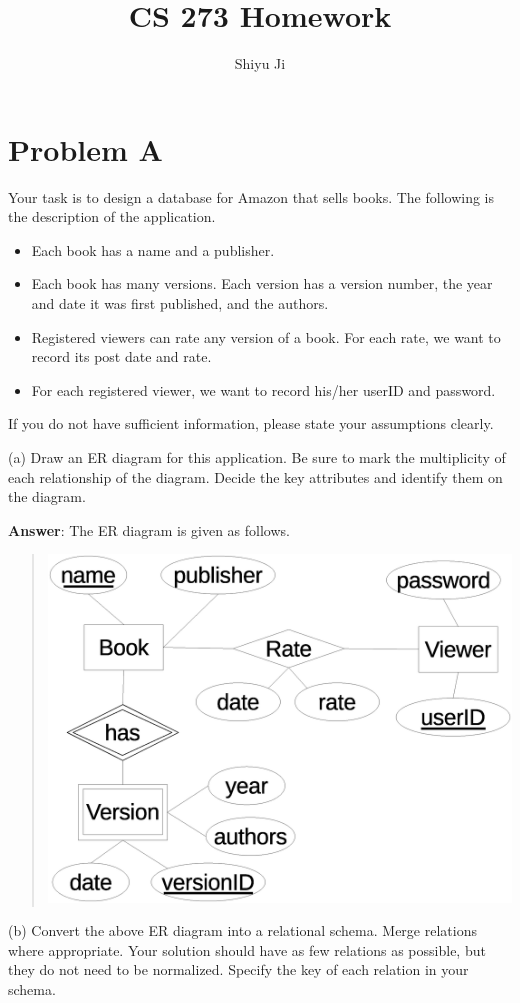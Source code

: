 \documentclass{article}
\begin{document}
\title{\bf CS 273 Homework}
\author{Shiyu Ji}
\date{}
\maketitle

\section{Problem A}
Your task is to design a database for Amazon that sells books.
The following is the description of the application.
\begin{itemize}
\item Each book has a name and a publisher.
\item Each book has many versions. Each version has a version number, the year and date it was first published, and the authors.
\item Registered viewers can rate any version of a book. For each rate, we want to record its post date and rate.
\item For each registered viewer, we want to record his/her userID and password.
\end{itemize}
If you do not have sufficient information, please state your assumptions clearly.

(a) Draw an ER diagram for this application. Be sure to mark the multiplicity of each relationship of the diagram. Decide the key attributes and identify them on the diagram.

{\bf Answer}:
The ER diagram is given as follows.
\begin{quote}
\centering
\includegraphics[width=.8\textwidth]{er.eps}
\end{quote}

(b) Convert the above ER diagram into a relational schema. Merge relations where appropriate. Your solution should have as few relations as possible, but they do not need to be normalized. Specify the key of each relation in your schema.
\end{document}
